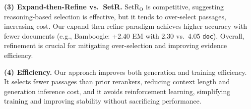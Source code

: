 \documentclass[11pt]{article}
\begin{document}
\textbf{(3) Expand-then-Refine vs.\ SetR.}
SetR$_\text{O}$ is competitive, suggesting reasoning-based selection is effective, but it tends to over-select passages, increasing cost.
Our expand-then-refine paradigm achieves higher accuracy with fewer documents (e.g., Bamboogle: +2.40 EM with 2.30 vs.\ 4.05 \texttt{doc}).
Overall, refinement is crucial for mitigating over-selection and improving evidence efficiency.

\textbf{(4) Efficiency.}
Our approach improves both generation and training efficiency.
It selects fewer passages than prior rerankers, reducing context length and generation inference cost, and it avoids reinforcement learning, simplifying training and improving stability without sacrificing performance.
\end{document}
